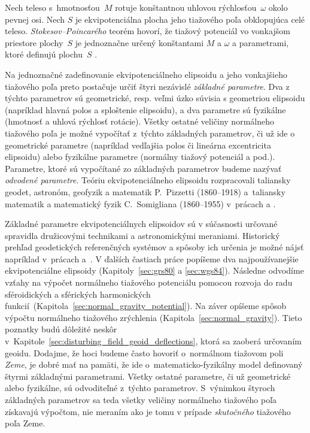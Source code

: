 \documentclass[a4paper,12pt]{book}
\begin{document}
Nech teleso s~hmotnosťou~$M$ rotuje konštantnou uhlovou rýchlosťou~$\omega$ 
okolo pevnej osi.  Nech $S$ je ekvipotenciálna plocha jeho tiažového poľa 
obklopujúca celé teleso.  \emph{Stokesov--Poincarého} teorém hovorí, že tiažový 
potenciál vo vonkajšom priestore plochy~$S$ je jednoznačne určený konštantami 
$M$ a $\omega$ a parametrami, ktoré definujú plochu~$S$ 
\parencite{TorgeGeodesy}.

Na jednoznačné zadefinovanie ekvipotenciálneho elipsoidu a jeho vonkajšieho 
tiažového poľa preto postačuje určiť štyri nezávislé \emph{základné parametre}.  
Dva z týchto parametrov sú geometrické, resp. veľmi úzko súvisia s geometriou 
elipsoidu (napríklad hlavná polos a sploštenie elipsoidu), a dva parametre sú 
fyzikálne (hmotnosť a uhlová rýchlosť rotácie).  Všetky ostatné veličiny 
normálneho tiažového poľa je možné vypočítať z~týchto základných parametrov, či 
už ide o geometrické parametre (napríklad vedľajšia polos či lineárna 
excentricita elipsoidu) alebo fyzikálne parametre (normálny tiažový potenciál 
a pod.).  Parametre, ktoré sú vypočítané zo základných parametrov budeme 
nazývať \emph{odvodené parametre}.  Teóriu ekvipotenciálneho elipsoidu 
rozpracovali taliansky geodet, astronóm, geofyzik a matematik P.~Pizzetti 
(1860--1918) a~taliansky matematik a matematický fyzik C.~Somigliana 
(1860--1955) v~prácach \textcite{Pizzetti1984} a \textcite{Somigliana1929}.

Základné parametre ekvipotenciálnych elipsoidov sú v súčasnosti určované 
spravidla družicovými technikami a astronomickými meraniami.  Historický 
prehľad geodetických referenčných systémov a spôsoby ich určenia je možné nájsť 
napríklad v~prácach \textcite{TorgeGeodesy} a~\textcite{MoritzPhysicalGeodesy}.  
V ďalších častiach práce popíšeme dva najpoužívanejšie ekvipotenciálne 
elipsoidy (Kapitoly~\ref{sec:grs80} a \ref{sec:wgs84}).  Následne odvodíme 
vzťahy na výpočet normálneho tiažového potenciálu pomocou rozvoja do radu 
sféroidických a sférických harmonických 
funkcií~(Kapitola~\ref{sec:normal_gravity_potential}).  Na záver opíšeme spôsob 
výpočtu normálneho tiažového zrýchlenia (Kapitola~\ref{sec:normal_gravity}).  
Tieto poznatky budú dôležité neskôr 
v~Kapitole~\ref{sec:disturbing_field_geoid_deflections}, ktorá sa zaoberá 
určovaním geoidu.  Dodajme, že hoci budeme často hovoriť o~normálnom tiažovom 
poli \emph{Zeme}, je dobré mať na pamäti, že ide o~matematicko-fyzikálny model 
definovaný štyrmi základnými parametrami.  Všetky ostatné parametre, či už 
geometrické alebo fyzikálne, sú odvoditeľné z~týchto parametrov.  S~výnimkou 
štyroch základných parametrov sa teda všetky veličiny normálneho tiažového poľa 
získavajú výpočtom, nie meraním ako je tomu v prípade \emph{skutočného} 
tiažového poľa Zeme.
\end{document}
